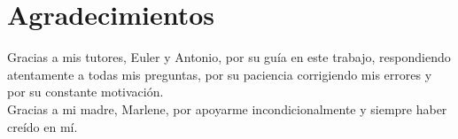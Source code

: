 \chapter*{Agradecimientos}

Gracias a mis tutores, Euler y Antonio, por su gu\'ia en este trabajo, respondiendo atentamente a todas mis preguntas, por su paciencia corrigiendo mis errores y por su constante motivación.\\

Gracias a mi madre, Marlene, por apoyarme incondicionalmente y siempre haber creído en mí.